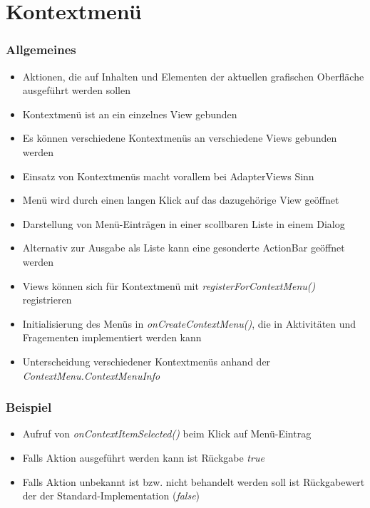 \section{Kontextmenü}
\begin{frame}
   \frametitle{Allgemeines}
   \begin{itemize}
      \item Aktionen, die auf Inhalten und Elementen der aktuellen 
         grafischen Oberfläche ausgeführt werden sollen
      \item Kontextmenü ist an ein einzelnes View gebunden
      \item Es können verschiedene Kontextmenüs an verschiedene 
         Views gebunden werden
      \item Einsatz von Kontextmenüs macht vorallem bei AdapterViews Sinn
      \item Menü wird durch einen langen Klick auf das dazugehörige View geöffnet
      \item Darstellung von Menü-Einträgen in einer scollbaren Liste in einem Dialog
      \item Alternativ zur Ausgabe als Liste kann eine gesonderte 
      	ActionBar geöffnet werden
      \item Views können sich für Kontextmenü mit \emph{registerForContextMenu()} registrieren
      \item Initialisierung des Menüs in \emph{onCreateContextMenu()}, die in 
         Aktivitäten und Fragementen implementiert werden kann
      \item Unterscheidung verschiedener Kontextmenüs anhand der \emph{ContextMenu.ContextMenuInfo}
   \end{itemize}
\end{frame}

\begin{frame}
   \frametitle{Beispiel}

   

   \begin{itemize}
      \item Aufruf von \emph{onContextItemSelected()} beim Klick auf Menü-Eintrag
      \item Falls Aktion ausgeführt werden kann ist Rückgabe \emph{true}
      \item Falls Aktion unbekannt ist bzw. nicht behandelt 
         werden soll ist Rückgabewert der der Standard-Implementation (\emph{false})
   \end{itemize}

   
\end{frame}

